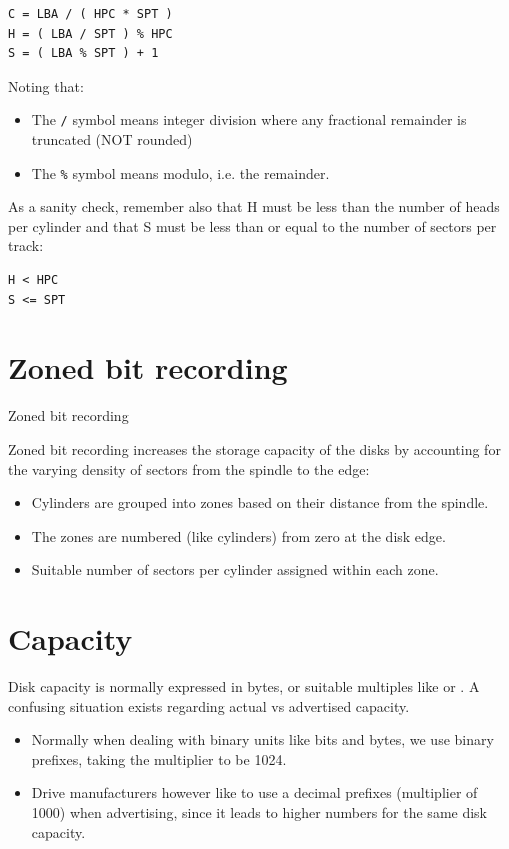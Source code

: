 \begin{verbatim}
C = LBA / ( HPC * SPT )
H = ( LBA / SPT ) % HPC
S = ( LBA % SPT ) + 1
\end{verbatim}

Noting that:

\begin{itemize}
\item
  The \texttt{/} symbol means integer division where any fractional
  remainder is truncated (NOT rounded)
\item
  The \texttt{\%} symbol means modulo, i.e. the remainder.
\end{itemize}

As a sanity check, remember also that H must be less than the number of
heads per cylinder and that S must be less than or equal to the number
of sectors per track:

\begin{verbatim}
H < HPC 
S <= SPT
\end{verbatim}

\section{Zoned bit recording}\label{zoned-bit-recording}


Zoned bit recording

Zoned bit recording increases the storage capacity of the disks by
accounting for the varying density of sectors from the spindle to the
edge:

\begin{itemize}
\item
  Cylinders are grouped into zones based on their distance from the
  spindle.
\item
  The zones are numbered (like cylinders) from zero at the disk edge.
\item
  Suitable number of sectors per cylinder assigned within each zone.
\end{itemize}

\section{Capacity}\label{capacity}

Disk capacity is normally expressed in bytes, or suitable multiples like
or . A confusing situation exists regarding actual vs advertised
capacity.

\begin{itemize}
\item
  Normally when dealing with binary units like bits and bytes, we use
  binary prefixes, taking the multiplier to be 1024.
\item
  Drive manufacturers however like to use a decimal prefixes (multiplier
  of 1000) when advertising, since it leads to higher numbers for the
  same disk capacity.
\end{itemize}

